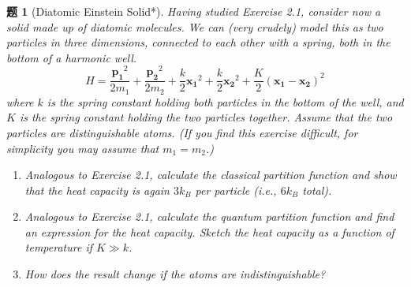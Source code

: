 \documentclass[UTF8,10pt,a4paper]{article}
\theoremstyle{Problem}
\newtheorem{prob}{题}
\theoremstyle{Solution}
\begin{document}
\begin{prob}[Diatomic Einstein Solid*]
    Having studied Exercise 2.1, consider now a solid made up of diatomic molecules. We can (very crudely) model this as two particles in three dimensions, connected to each other with a spring, both in the bottom of a harmonic well.
    \[
        H=\frac{\bm{p_1}^2}{2m_1}+\frac{\bm{p_2}^2}{2m_2}+\frac{k}{2}\bm{x_1}^2+\frac{k}{2}\bm{x_2}^2+\frac{K}{2}(\bm{x_1}-\bm{x_2})^2
    \]
    where $k$ is the spring constant holding both particles in the bottom of the well, and $K$ is the spring constant holding the two particles together. Assume that the two particles are distinguishable atoms.
    (If you find this exercise difficult, for simplicity you may assume that $m_1=m_2$.)
    \begin{enumerate}
        \item[(a)] Analogous to Exercise 2.1, calculate the classical partition function and show that the heat capacity is again $3k_B$ per particle (i.e., $6k_B$ total).
        \item[(b)] Analogous to Exercise 2.1, calculate the quantum partition function and find an expression for the heat capacity. Sketch the heat capacity as a function of temperature if $K\gg k$.
        \item[(c)$^{**}$] How does the result change if the atoms are indistinguishable?
    \end{enumerate}
\end{prob}
\end{document}
